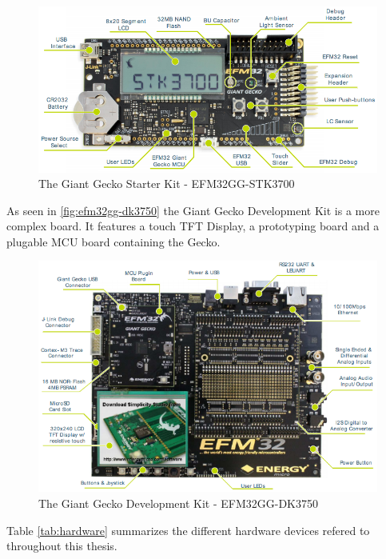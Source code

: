 \begin{figure}[H]
  \begin{center}
    \includegraphics[scale=0.4]{figures/efm32gg-stk3700}
  \end{center}
  \caption{The Giant Gecko Starter Kit - EFM32GG-STK3700}
  \label{fig:efm32gg-stk3700}
\end{figure}

As seen in \autoref{fig:efm32gg-dk3750} the Giant Gecko Development Kit is a more complex board.
It features a touch TFT Display, a prototyping board and a plugable MCU board containing the Gecko.

\begin{figure}[H]
  \begin{center}
    \includegraphics[scale=0.5]{figures/efm32gg-dk3750}
  \end{center}
  \caption{The Giant Gecko Development Kit - EFM32GG-DK3750}
  \label{fig:efm32gg-dk3750}
\end{figure}

Table \ref{tab:hardware} summarizes the different hardware devices refered to throughout this thesis.

